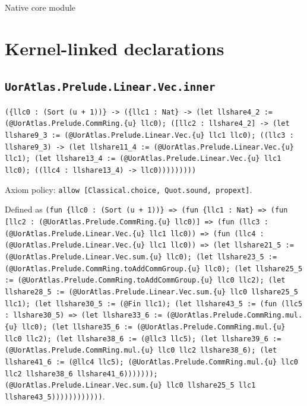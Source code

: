 \documentclass[11pt]{article}
\begin{document}
\begin{center}{\LARGE Native core module}\end{center}
\section*{Kernel-linked declarations}
\subsection*{\texttt{UorAtlas.Prelude.Linear.Vec.inner}}
\noindent\texttt{(\{llc0 : (Sort (u + 1))\} -> (\{llc1 : Nat\} -> (let llshare4\_2 := (@UorAtlas.Prelude.CommRing.\{u\} llc0); ([llc2 : llshare4\_2] -> (let llshare9\_3 := (@UorAtlas.Prelude.Linear.Vec.\{u\} llc1 llc0); ((llc3 : llshare9\_3) -> (let llshare11\_4 := (@UorAtlas.Prelude.Linear.Vec.\{u\} llc1); (let llshare13\_4 := (@UorAtlas.Prelude.Linear.Vec.\{u\} llc1 llc0); ((llc4 : llshare13\_4) -> llc0)))))))))}\par
\noindent Axiom policy: \texttt{allow [Classical.choice, Quot.sound, propext]}.\par
\noindent Defined as \texttt{(fun \{llc0 : (Sort (u + 1))\} => (fun \{llc1 : Nat\} => (fun [llc2 : (@UorAtlas.Prelude.CommRing.\{u\} llc0)] => (fun (llc3 : (@UorAtlas.Prelude.Linear.Vec.\{u\} llc1 llc0)) => (fun (llc4 : (@UorAtlas.Prelude.Linear.Vec.\{u\} llc1 llc0)) => (let llshare21\_5 := (@UorAtlas.Prelude.Linear.Vec.sum.\{u\} llc0); (let llshare23\_5 := (@UorAtlas.Prelude.CommRing.toAddCommGroup.\{u\} llc0); (let llshare25\_5 := (@UorAtlas.Prelude.CommRing.toAddCommGroup.\{u\} llc0 llc2); (let llshare28\_5 := (@UorAtlas.Prelude.Linear.Vec.sum.\{u\} llc0 llshare25\_5 llc1); (let llshare30\_5 := (@Fin llc1); (let llshare43\_5 := (fun (llc5 : llshare30\_5) => (let llshare33\_6 := (@UorAtlas.Prelude.CommRing.mul.\{u\} llc0); (let llshare35\_6 := (@UorAtlas.Prelude.CommRing.mul.\{u\} llc0 llc2); (let llshare38\_6 := (@llc3 llc5); (let llshare39\_6 := (@UorAtlas.Prelude.CommRing.mul.\{u\} llc0 llc2 llshare38\_6); (let llshare41\_6 := (@llc4 llc5); (@UorAtlas.Prelude.CommRing.mul.\{u\} llc0 llc2 llshare38\_6 llshare41\_6))))))); (@UorAtlas.Prelude.Linear.Vec.sum.\{u\} llc0 llshare25\_5 llc1 llshare43\_5))))))))))))}.\par
\end{document}

